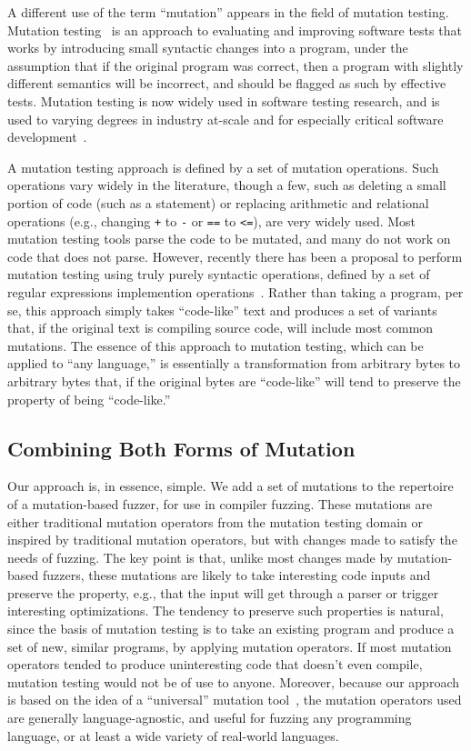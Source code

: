 A different use of the term ``mutation'' appears in the field of mutation testing.  Mutation testing~\cite{MutationSurvey,budd1979mutation,demillo1978hints} is an approach to evaluating and improving software tests that works by introducing small syntactic changes into a program, under the assumption that if the original program was correct, then a program with slightly different semantics will be incorrect, and should be flagged as such by effective tests.  Mutation testing is now widely used in software testing research, and is used to varying degrees in industry at-scale and for especially critical software development~\cite{mutKernel,mutGoogle,mutFacebook}.

A mutation testing approach is defined by a set of mutation operations.  Such operations vary widely in the literature, though a few, such as deleting a small portion of code (such as a statement) or replacing arithmetic and relational operations (e.g., changing {\tt +} to {\tt -} or {\tt ==} to {\tt <=}), are very widely used.  Most mutation testing tools parse the code to be mutated, and many do not work on code that does not parse.  However, recently there has been a proposal to perform mutation testing using truly purely syntactic operations, defined by a set of regular expressions implemention operations~\cite{regexpMut}.  Rather than taking a program, per se, this approach simply takes ``code-like'' text and produces a set of variants that, if the original text is compiling source code, will include most common mutations.  The essence of this approach to mutation testing, which can be applied to ``any language,'' is essentially a transformation from arbitrary bytes to arbitrary bytes that, if the original bytes are ``code-like'' will tend to preserve the property of being ``code-like.''


\subsection{Combining Both Forms of Mutation}

Our approach is, in essence, simple.  We add a set of mutations to the repertoire of a mutation-based fuzzer, for use in compiler fuzzing.  These mutations are either traditional mutation operators from the mutation testing domain or inspired by traditional mutation operators, but with changes made to satisfy the needs of fuzzing.  The key point is that, unlike most changes made by mutation-based fuzzers, these mutations are likely to take interesting code inputs and preserve the property, e.g., that the input will get through a parser or trigger interesting optimizations.  The tendency to preserve such properties is natural, since the basis of mutation testing is to take an existing program and produce a set of new, similar programs, by applying mutation operators.  If most mutation operators tended to produce uninteresting code that doesn't even compile, mutation testing would not be of use to anyone.  Moreover, because our approach is based on the idea of a ``universal'' mutation tool~\cite{regexpMut}, the mutation operators used are generally language-agnostic, and useful for fuzzing any programming language, or at least a wide variety of real-world languages.

